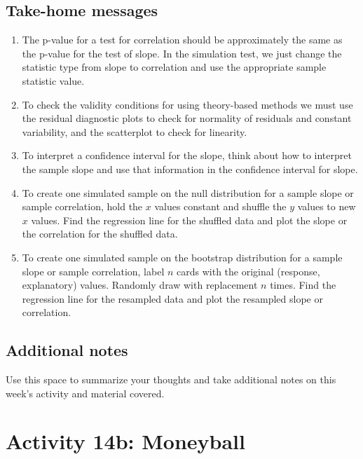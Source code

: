 \documentclass[
]{report}
\begin{document}
\vspace{1in}

\hypertarget{take-home-messages-20}{%
\subsection{Take-home messages}\label{take-home-messages-20}}

\begin{enumerate}
\def\labelenumi{\arabic{enumi}.}
\item
  The p-value for a test for correlation should be approximately the same as the p-value for the test of slope. In the simulation test, we just change the statistic type from slope to correlation and use the appropriate sample statistic value.
\item
  To check the validity conditions for using theory-based methods we must use the residual diagnostic plots to check for normality of residuals and constant variability, and the scatterplot to check for linearity.
\item
  To interpret a confidence interval for the slope, think about how to interpret the sample slope and use that information in the confidence interval for slope.
\item
  To create one simulated sample on the null distribution for a sample slope or sample correlation, hold the \(x\) values constant and shuffle the \(y\) values to new \(x\) values. Find the regression line for the shuffled data and plot the slope or the correlation for the shuffled data.
\item
  To create one simulated sample on the bootstrap distribution for a sample slope or sample correlation, label \(n\) cards with the original (response, explanatory) values. Randomly draw with replacement \(n\) times. Find the regression line for the resampled data and plot the resampled slope or correlation.
\end{enumerate}

\hypertarget{additional-notes-17}{%
\subsection{Additional notes}\label{additional-notes-17}}

Use this space to summarize your thoughts and take additional notes on this week's activity and material covered.

\newpage

\hypertarget{activity-14b-moneyball}{%
\section{Activity 14b: Moneyball}\label{activity-14b-moneyball}}
\end{document}
